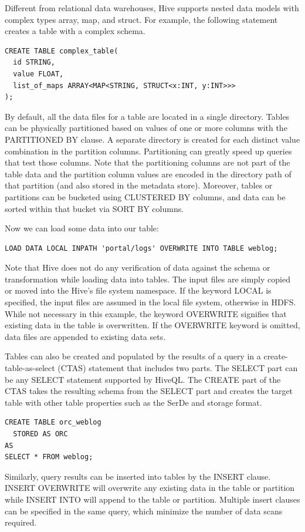 \documentclass[12pt]{book}
\begin{document}
Different from relational data warehouses, Hive supports nested data models with complex types array, map, and struct. For example, the following statement creates a table with a complex schema.

\begin{lstlisting}
CREATE TABLE complex_table(
  id STRING,
  value FLOAT,
  list_of_maps ARRAY<MAP<STRING, STRUCT<x:INT, y:INT>>>
);
\end{lstlisting}
By default, all the data files for a table are located in a single directory. Tables can be physically partitioned based on values of one or more columns with the PARTITIONED BY clause. A separate directory is created for each distinct value combination in the partition columns. Partitioning can greatly speed up queries that test those columns. Note that the partitioning columns are not part of the table data and the partition column values are encoded in the directory path of that partition (and also stored in the metadata store). Moreover, tables or partitions can be bucketed using CLUSTERED BY columns, and data can be sorted within that bucket via SORT BY columns.

Now we can load some data into our table:

\begin{lstlisting}
LOAD DATA LOCAL INPATH 'portal/logs' OVERWRITE INTO TABLE weblog;
\end{lstlisting}
Note that Hive does not do any verification of data against the schema or transformation while loading data into tables. The input files are simply copied or moved into the Hive's file system namespace. If the keyword LOCAL is specified, the input files are assumed in the local file system, otherwise in HDFS. While not necessary in this example, the keyword OVERWRITE signifies that existing data in the table is overwritten. If the OVERWRITE keyword is omitted, data files are appended to existing data sets.

Tables can also be created and populated by the results of a query in a create-table-as-select (CTAS) statement that includes two parts. The SELECT part can be any SELECT statement supported by HiveQL. The CREATE part of the CTAS takes the resulting schema from the SELECT part and creates the target table with other table properties such as the SerDe and storage format.

\begin{lstlisting}
CREATE TABLE orc_weblog
  STORED AS ORC
AS
SELECT * FROM weblog;
\end{lstlisting}
Similarly, query results can be inserted into tables by the INSERT clause. INSERT OVERWRITE will overwrite any existing data in the table or partition while INSERT INTO will append to the table or partition. Multiple insert clauses can be specified in the same query, which minimize the number of data scans required.
\end{document}
